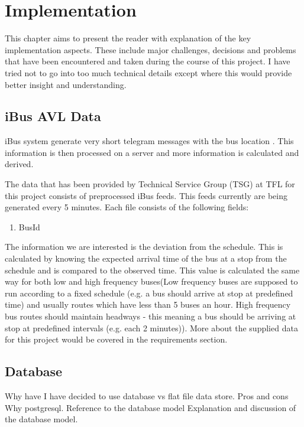 \chapter{Implementation}
This chapter aims to present the reader with explanation of the key implementation aspects. These include major challenges, decisions and problems that have been encountered and taken during the course of this project. I have tried not to go into too much technical details except where this would provide better insight and understanding.

\section{iBus AVL Data}
iBus system generate very short telegram messages with the bus location \cite{Hounsell201276}. This information is then processed on a server and more information is calculated and derived.

The data that has been provided by Technical Service Group (TSG) at TFL for this project consists of preprocessed iBus feeds. This feeds currently are being generated every 5 minutes. Each file consists of the following fields:
\begin{enumerate}
\item BusId
\end{enumerate}

The information we are interested is the deviation from the schedule. This is calculated by knowing the expected arrival time of the bus at a stop from the schedule and is compared to the observed time. This value is calculated the same way for both low and high frequency buses(Low frequency buses are supposed to run according to a fixed schedule (e.g. a bus should arrive at stop at predefined time) and usually routes which have less than 5 buses an hour. High frequency bus routes should maintain headways - this meaning a bus should be arriving at stop at predefined intervals (e.g. each 2 minutes)). More about the supplied data for this project would be covered in the requirements section.

\section{Database}
Why have I have decided to use database vs flat file data store. Pros and cons
Why postgresql. Reference to the database model
Explanation and discussion of the database model.

